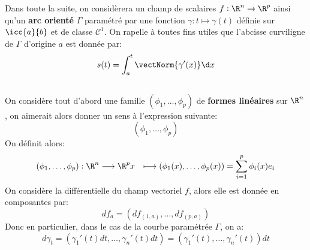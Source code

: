 Dans toute la suite, on considèrera un champ de scalaires \(f : \R^n \rightarrow \R^p\) ainsi qu'un \textbf{arc orienté} \(\Gamma\) paramétré par une fonction \(\gamma : t \mapsto \gamma(t)\) définie sur \(\icc{a}{b}\) et de classe \(\mathcal{C}^1\). On rapelle à toutes fins utiles que l'abcisse curviligne de \(\Gamma\) d'origine \(a\) est donnée par:
\[
   s(t) = \int_{a}^{t} \vectNorm{\gamma'(x)} \d x   
\] 

\subsection*{}
On considère tout d'abord une famille \((\phi_1, \ldots, \phi_p)\) de \textbf{formes linéaires} sur \(\R^n\), on aimerait alors donner un sens à l'expression suivante:
\[
   (\phi_1, \ldots, \phi_p)   
\]
On définit alors:
\[
   \begin{aligned}
      (\phi_1, \ldots, \phi_p) : \R^n &\longrightarrow \R^p
      x &\longmapsto (\phi_1(x), \ldots, \phi_p(x)) = \sum_{i=1}^{p} \phi_i(x)e_i
   \end{aligned}
\]
On considère la différentielle du champ vectoriel \(f\), alors elle est donnée en composantes par:
\[
   df_a = (df_{(1, a)}, \ldots, df_{(p, a)})   
\]
Donc en particulier, dans le cas de la courbe paramétrée \(\Gamma\), on a:
\[
   d\gamma_t = (\gamma_1'(t) dt, \ldots, \gamma_n'(t) dt) = (\gamma_1'(t), \ldots, \gamma_n'(t))dt  
\]